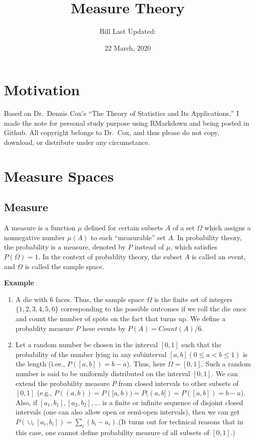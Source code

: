 \documentclass[
]{book}
\title{Measure Theory}
\author{Bill Last Updated:}
\date{22 March, 2020}
\begin{document}
\frontmatter
\maketitle

{
\setcounter{tocdepth}{1}
\tableofcontents
}
\mainmatter
\hypertarget{my-section}{%
\chapter*{Motivation}\label{my-section}}

Based on Dr.~Dennis Cox's ``The Theory of Statistics and Its Applications,'' I made the note for personal study purpose using RMarkdown and being posted in Github. All copyright belongs to Dr.~Cox, and thus please do not copy, download, or distribute under any circumstance.

\hypertarget{measure-spaces}{%
\chapter{Measure Spaces}\label{measure-spaces}}

\hypertarget{measure}{%
\section{Measure}\label{measure}}

A measure is a function \(\mu\) defined for certain subsets \(A\) of a set \(\Omega\) which assigns a nonnegative number \(\mu(A)\) to each ``measurable'' set \(A\). In probability theory, the probability is a measure, denoted by \(P\) instead of \(\mu\), which satisfies \(P(\Omega)=1\). In the context of probablity theory, the subset \(A\) is called an event, and \(\Omega\) is called the sample space.

\textbf{Example}

\begin{enumerate}
\def\labelenumi{(\arabic{enumi})}
\item
  A die with 6 faces. Thus, the sample space \(\Omega\) is the finite set of integers \(\{1, 2, 3, 4, 5, 6\}\) corresponding to the possible outcomes if we roll the die once and count the number of spots on the fact that turns up. We define a probablity measure \(P\) hese events by \(P(A)=Count(A)/6\).
\item
  Let a random number be chosen in the interval \([0,1]\) such that the probability of the number lying in any subinterval \([a,b] (0 \leq a < b \leq 1)\) is the length (i.ee., \(P([a,b])=b-a\)). Thus, here \(\Omega=[0,1]\). Such a random number is said to be uniformly distributed on the interval \([0,1]\). We can extend the probability measure \(P\) from closed intervals to other subsets of \([0,1]\) (e.g., \(P((a,b))=P([a,b))=P((a,b])=P([a,b])=b-a\)). Also, if \([a_1,b_1],[a_2,b_2],...\) is a finite or infinite sequence of disjoint closed intervals (one can also allow open or semi-open intervals), then we can get \(P(\cup_i[a_i,b_i])=\sum_i(b_i-a_i)\).(It turns out for technical reasons that in this case, one cannot define probability measure of all subsets of \([0,1]\).)
\end{enumerate}
\end{document}
